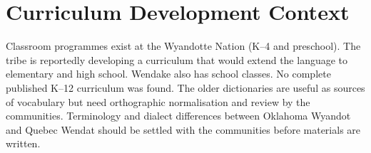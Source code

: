 \documentclass[12pt]{article}
\begin{document}
\section{Curriculum Development Context}
Classroom programmes exist at the Wyandotte Nation (K--4 and preschool). The tribe is reportedly developing a curriculum that would extend the language to elementary and high school. Wendake also has school classes. No complete published K--12 curriculum was found. The older dictionaries are useful as sources of vocabulary but need orthographic normalisation and review by the communities. Terminology and dialect differences between Oklahoma Wyandot and Quebec Wendat should be settled with the communities before materials are written.
\end{document}
